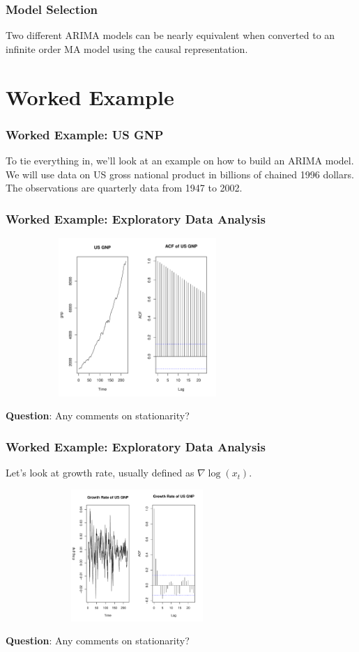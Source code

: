 \documentclass[%
xcolor=pdftex]{beamer}
\begin{document}
\begin{frame}
\frametitle{Model Selection}

Two different ARIMA models can be nearly equivalent when converted to an infinite order MA model using the causal representation.

\end{frame}

\section{Worked Example}
\frame{\tableofcontents[currentsection]}

\begin{frame}
\frametitle{Worked Example: US GNP}

To tie everything in, we'll look at an example on how to build an ARIMA model. We will use data on US gross national product in billions of chained 1996 dollars. The observations are quarterly data from 1947 to 2002.

\end{frame}

\begin{frame}
\frametitle{Worked Example: Exploratory Data Analysis}

\includegraphics[width=100mm, height=60mm]{ts.pdf}

\textbf{Question}: Any comments on stationarity?

\end{frame}

\begin{frame}
\frametitle{Worked Example: Exploratory Data Analysis}

Let's look at growth rate, usually defined as $\nabla \log(x_t)$.

\includegraphics[width=100mm, height=50mm]{growth.pdf}

\textbf{Question}: Any comments on stationarity?

\end{frame}
\end{document}
